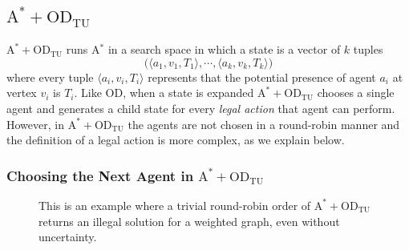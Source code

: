 \documentclass[jair,twoside,11pt,theapa]{article}
\newcommand{\tuple}[1]{\langle#1\rangle}
\newcommand{\astar}{A$^*$\xspace}
\newcommand{\sourcetargets}{\mathcal{S}}
\newcommand{\odatu}{$\mathrm{A^{*}+OD_{TU}}$\xspace}
\begin{document}
\subsection{\odatu}

\odatu runs \astar in a search space in which a state is a vector of $k$ tuples 
\[ \big(\tuple{a_1,v_1,T_1}, \cdots, \tuple{a_k, v_k, T_k}\big)\]  
where every tuple $\tuple{a_i, v_i, T_i}$ represents that the potential presence of agent $a_i$ at vertex $v_i$ is $T_i$. 
Like OD, when a state is expanded \odatu chooses a single agent and generates a child state for every \emph{legal action} that agent can perform. 
However, in \odatu the agents are not chosen in a round-robin manner and the definition of a legal action is more complex, as we explain below. 

\subsubsection{Choosing the Next Agent in \odatu}


%
\begin{figure}[ht]
\centering
{}
%
\caption
{
This is an example where a trivial round-robin order of \odatu returns an illegal solution for a weighted graph, even without uncertainty.%
}
\label{oda-fail}
\end{figure}
\end{document}
